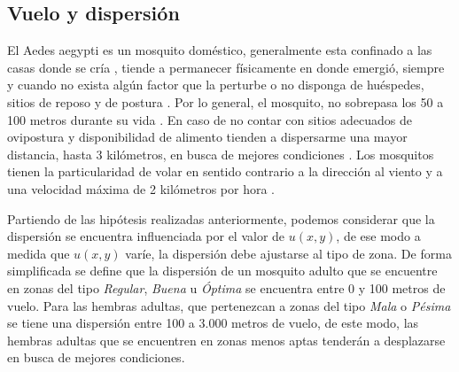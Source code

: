 
\subsection{Vuelo y dispersión}
El Aedes aegypti es un mosquito doméstico, generalmente esta confinado a las casas donde se
cría \cite{luevano1993ciclo}, tiende a permanecer físicamente en donde emergió, siempre y cuando
no exista algún factor que la perturbe o no disponga de huéspedes, sitios de reposo y de postura
\cite{ThironIzcazaJ2003}. Por lo general, el mosquito, no sobrepasa los 50 a 100 metros durante su
vida \cite{cabezas2005dengue}. En caso de no contar con sitios adecuados de ovipostura y
disponibilidad de alimento tienden a dispersarme una mayor distancia, hasta 3 kilómetros, en
busca de mejores condiciones \cite{ThironIzcazaJ2003}. Los mosquitos tienen la particularidad de
volar en sentido contrario a la dirección al viento \cite{ThironIzcazaJ2003,web-site:speedAnimals}
y a una velocidad máxima de 2 kilómetros por hora \cite{web-site:speedAnimals,kaufmann2004flight}.

Partiendo de las hipótesis realizadas anteriormente, podemos considerar que la dispersión se
encuentra influenciada por el valor de $u(x,y)$, de ese modo a medida que $u(x,y)$ varíe, la
dispersión debe ajustarse al tipo de zona. De forma simplificada se define que la dispersión de un
mosquito adulto que se encuentre en zonas del tipo \textit{Regular}, \textit{Buena} u
\textit{Óptima} se encuentra entre 0 y 100 metros de vuelo. Para las hembras adultas, que
pertenezcan a zonas del tipo \textit{Mala} o \textit{Pésima} se tiene una dispersión entre
100 a 3.000 metros de vuelo, de este modo, las hembras adultas que se encuentren en zonas menos
aptas tenderán a desplazarse en busca de mejores condiciones.
